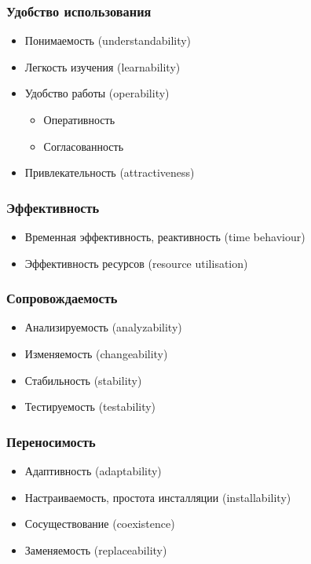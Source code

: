 \documentclass{../../slides-style}
\begin{document}
    \begin{frame}
        \frametitle{Удобство использования}
        \begin{itemize}
            \item Понимаемость (understandability)
            \item Легкость изучения (learnability)
            \item Удобство работы (operability)
            \begin{itemize}
                \item Оперативность
                \item Согласованность
            \end{itemize}
            \item Привлекательность (attractiveness)
        \end{itemize}
    \end{frame}

    \begin{frame}
        \frametitle{Эффективность}
        \begin{itemize}
            \item Временная эффективность, реактивность (time behaviour)
            \item Эффективность ресурсов (resource utilisation)
        \end{itemize}
    \end{frame}

    \begin{frame}
        \frametitle{Сопровождаемость}
        \begin{itemize}
            \item Анализируемость (analyzability)
            \item Изменяемость (changeability)
            \item Стабильность (stability)
            \item Тестируемость (testability)
        \end{itemize}
    \end{frame}

    \begin{frame}
        \frametitle{Переносимость}
        \begin{itemize}
            \item Адаптивность (adaptability)
            \item Настраиваемость, простота инсталляции (installability)
            \item Сосуществование (coexistence)
            \item Заменяемость (replaceability)
        \end{itemize}
    \end{frame}
\end{document}
